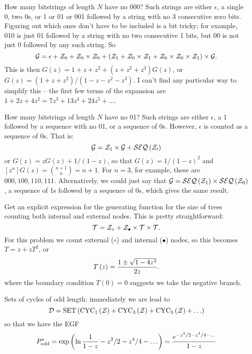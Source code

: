 \vskip 0.08in  How many bitstrings of
length $N$ have no 000?\hfil\break
Such strings are either $\epsilon$, a single 0, two 0s, or 1 or 01 or 001 followed
by a string with no 3 consecutive zero bits.  Figuring out which ones
don't have to be included is a bit tricky; for example, 010 is just 01 followed
by a string with no two consecutive 1 bits, but 00 is not just 0 followed
by any such string.  So
$$
 {\cal G} = \epsilon + {\cal Z}_0 + {\cal Z}_0 \times {\cal Z}_0
   + \left({\cal Z}_1 + {\cal Z}_0 \times {\cal Z}_1 
   + {\cal Z}_0 \times {\cal Z}_0 \times {\cal Z}_1\right) \times {\cal G}.
$$
This is then $G\left(z\right) = 1 + z + z^2 + \left(z + z^2 + z^3\right) G\left(z\right)$,
or $G\left(z\right) = \left(1 + z + z^2\right) / \left(1 - z - z^2 - z^3\right)$.  I can't
find any particular way to simplify this -- the first few terms of the expansion
are $1 + 2z + 4z^2 = 7z^3 + 13z^4 + 24z^5 + \ldots$.

\vskip 0.08in  How many bitstrings of
length $N$ have no 01?\hfil\break
Such strings are either $\epsilon$, a 1 followed by a sequence with no 01,
or a sequence of 0s.  However, $\epsilon$ is counted as a sequence of 0s. That is:
$$
 {\cal G} = {\cal Z}_1 \times {\cal G} + {\cal SEQ}\left({\cal Z_0}\right)
$$
or $G\left(z\right) = z G\left(z\right) + 1 /\left( 1 - z \right) $, so that
$G\left(z\right) = 1 / \left(1 - z\right)^2$ and $\left[z^n\right] G\left(z\right) =
{n + 1 \choose n} = n + 1$.  For $n=3$, for example, these are
$000, 100, 110, 111$.  Alternatively, we could just say that
${\cal G} = {\cal SEQ}\left({\cal Z}_1\right) \times {\cal SEQ}\left({\cal Z}_0\right)$,
a sequence of 1s followed by a sequence of 0s, which gives the same result.

\vskip 0.08in  Get an explicit expression for the 
generating function for the size of trees counting both internal and external nodes.
This is pretty straightforward: 
$$
 {\cal T} = {\cal Z}_{\circ} + {\cal Z}_{\bullet} \times {\cal T} \times {\cal T}.
$$
For this problem we count external ($\circ$) and internal ($\bullet$) nodes,
so this becomes $T = z + z T^2$, or
$$
 T\left(z\right) = {1 \pm \sqrt{1 - 4 z^2} \over 2 z}.
$$
where the boundary condition $T\left(0\right) = 0$ suggests we take the negative branch.

\vskip 0.08in  Sets of cycles of odd length:
immediately we are lead to 
$$
{\cal D} = {\rm SET} \left(
{\rm CYC}_1\left({\cal Z}\right) + {\rm CYC}_3 \left({\cal Z}\right) +
 {\rm CYC}_5 \left({\cal Z}\right) + \ldots \right)
 $$
 so that we have the EGF
 $$
 P^{\star}_{\rm odd} = \exp \left( \ln {1 \over 1 - z } - z^2/2 - z^4/4 - \ldots\right)
  = { e^{-z^2/2 - z^4/4 - \ldots} \over 1 - z }
$$

